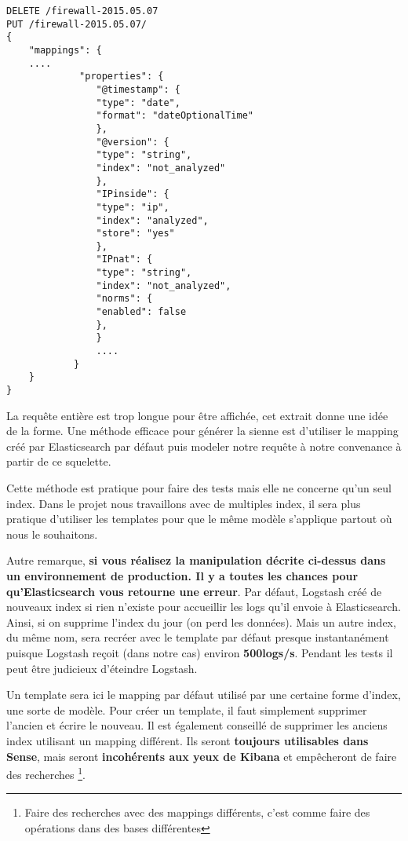 {\begin{lstlisting}[style=code,label={lst:mappingiput1},caption={Changer le mapping d'un index}]
DELETE /firewall-2015.05.07
PUT /firewall-2015.05.07/
{
    "mappings": {
    ....
             "properties": {
                "@timestamp": {
                "type": "date",
                "format": "dateOptionalTime"
                },
                "@version": {
                "type": "string",
                "index": "not_analyzed"
                },
                "IPinside": {
                "type": "ip",
                "index": "analyzed",
                "store": "yes"
                },
                "IPnat": {
                "type": "string",
                "index": "not_analyzed",
                "norms": {
                "enabled": false
                },
                }
                ....
            }
    }
}
\end{lstlisting}

La requête entière est trop longue pour être affichée, cet extrait donne une idée de la forme.
Une méthode efficace pour générer la sienne est d'utiliser le mapping créé par Elasticsearch
par défaut puis modeler notre requête à notre convenance à partir de ce squelette.

Cette méthode est pratique pour faire des tests mais elle ne concerne qu'un seul 
index. Dans le projet nous travaillons avec de multiples index, il sera plus pratique
d'utiliser les templates pour que le même modèle s'applique partout où nous le souhaitons.

Autre remarque, \textbf{si vous réalisez la manipulation décrite ci-dessus dans un environnement de 
production. Il y a toutes les chances pour qu'Elasticsearch vous retourne une erreur}.
Par défaut, Logstash créé de nouveaux index si rien n'existe pour accueillir les logs 
qu'il envoie à Elasticsearch. Ainsi, si on supprime l'index du jour (on perd les données).
Mais un autre index, du même nom, sera recréer avec le template par défaut presque 
instantanément puisque Logstash reçoit (dans notre cas) environ \textbf{500logs/s}. 
Pendant les tests il peut être judicieux d'éteindre Logstash.


Un template sera ici le mapping par défaut utilisé par une certaine forme d'index, une sorte de modèle.
Pour créer un template, il faut simplement supprimer l'ancien et écrire le nouveau.
Il est également conseillé de supprimer les anciens index utilisant un mapping 
différent. Ils seront \textbf{toujours utilisables dans Sense}, mais seront 
\textbf{incohérents aux yeux de Kibana} et empêcheront de faire des recherches
\footnote{Faire des recherches avec des mappings différents, c'est comme faire des opérations dans des bases différentes}.\\[2mm]


}

